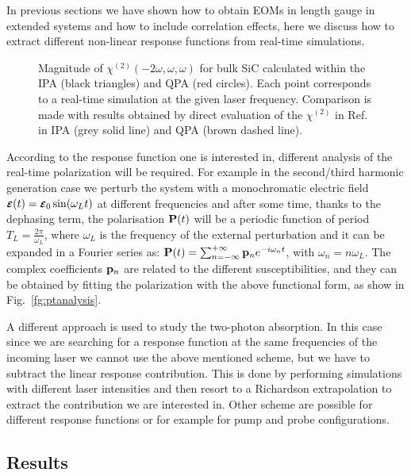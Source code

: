 In previous sections we have shown how to obtain EOMs in length gauge in extended systems and how to include correlation effects, here we discuss how to extract different non-linear response functions from real-time simulations.\\
\begin{figure}
\centering
{}
\caption{\footnotesize{Magnitude of $\chi^{(2)}(-2\omega,\omega,\omega)$ for bulk SiC calculated within the IPA (black triangles) and QPA (red circles). Each point corresponds to a real-time simulation at the given laser frequency. Comparison is made with results obtained \ai by direct evaluation of the $\chi^{(2)}$ in Ref.~\cite{PhysRevB.82.235201} in IPA (grey solid line) and QPA (brown dashed line).  \label{fg:SiCQPRPA} }}
\end{figure}
According to the response function one is interested in, different analysis of the real-time polarization will be required. For example in the second/third harmonic generation case we perturb the system with a monochromatic electric field $\boldsymbol{\scriptstyle \cal E}(t) = \boldsymbol{\scriptstyle \cal E}_0 \sin(\omega_L t)$ at different frequencies and after some time, thanks to the dephasing term, the  polarisation ${\bf P}(t)$ will be a periodic function of period $T_L =\frac{2\pi}{\omega_L}$, where $\omega_L$ is the frequency of the external perturbation and it can be expanded in a Fourier series as: $ {\bf P}(t) = \sum_{n=-\infty}^{+\infty} {\bf p}_n e^{-i\omega_n t} $, with $\omega_n = n \omega_L$. The complex coefficients ${\bf p}_n$ are related to the different susceptibilities, and they can be obtained by fitting the polarization with the above functional form, as show in Fig.~\ref{fg:ptanalysis}. 

A different approach is used to study the two-photon absorption. In this case since we are searching for a response function at the same frequencies of the incoming laser we cannot use the above mentioned scheme, but we have to subtract the linear response contribution. This is done by performing simulations with different laser intensities and then  resort to a Richardson extrapolation to extract the contribution we are interested in.\cite{attaccalite2018two} Other scheme are possible for different response functions or for example for pump and probe configurations.

\subsection{Results}\label{sc:results}

